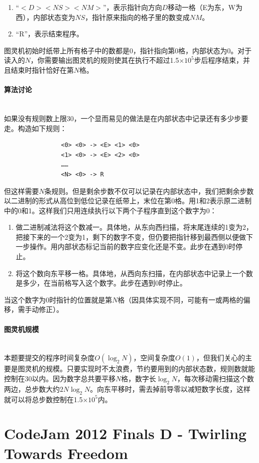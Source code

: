 \documentclass[UTF8]{ctexart}
\newcommand{\myparagraph}[1]{\paragraph{#1}\mbox{}\\}
\theoremstyle{nonumberplain}
\begin{document}
			\begin{enumerate}
				\item “$<D> <NS> <NM>$”，表示指针向方向$D$移动一格（E为东，W为西），内部状态变为$NS$，指针原来指向的格子里的数变成$NM$。
				\item “R”，表示结束程序。
			\end{enumerate}
			
			图灵机初始时纸带上所有格子中的数都是0，指针指向第0格，内部状态为0。对于读入的$N$，你需要输出图灵机的规则使其在执行不超过1.5×$10^5$步后程序结束，并且结束时指针恰好在第$N$格。
		
		\myparagraph{算法讨论}
		
			如果没有规则数上限$30$，一个显而易见的做法是在内部状态中记录还有多少步要走。构造如下规则：
			
			\begin{verbatim}
				<0> <0> -> <E> <1> <0>
				<1> <0> -> <E> <2> <0>
				……
				<N> <0> -> R
			\end{verbatim}
			
			但这样需要$N$条规则。但是剩余步数不仅可以记录在内部状态中，我们把剩余步数以二进制的形式从高位到低位记录在纸带上，末位在第0格。用1和2表示原二进制中的0和1。这样我们只用连续执行以下两个子程序直到这个数字为0：
			
			\begin{enumerate}
				\item 做二进制减法将这个数减一。具体地，从东向西扫描，将末尾连续的1变为2，把接下来的一个2变为1，剩下的数字不变，但仍要把指针移到最西侧以便做下一步操作。用内部状态标记当前的数字应变化还是不变。此步在遇到0时停止。
				\item 将这个数向东平移一格。具体地，从西向东扫描，在内部状态中记录上一个数是多少，在当前格写入这个数字。此步在遇到0时停止。
			\end{enumerate}
			
			当这个数字为0时指针的位置就是第$N$格（因具体实现不同，可能有一或两格的偏移，需手动修正）。
		
		\myparagraph{图灵机规模}
		
			本题要提交的程序时间复杂度$O(\log_2N)$，空间复杂度$O(1)$，但我们关心的主要是图灵机的规模。只要实现时不太浪费，节约要用到的内部状态数，规则数就能控制在$30$以内。因为数字总共要平移$N$格，数字长$\log_2N$，每次移动需扫描这个数两边，总步数大约$2N\log_2N$。向东平移时，需去掉前导零以减短数字长度，这样就可以将总步数控制在1.5×$10^5$内。
	
	\section{CodeJam 2012 Finals D - Twirling Towards Freedom}
	
\end{document}
